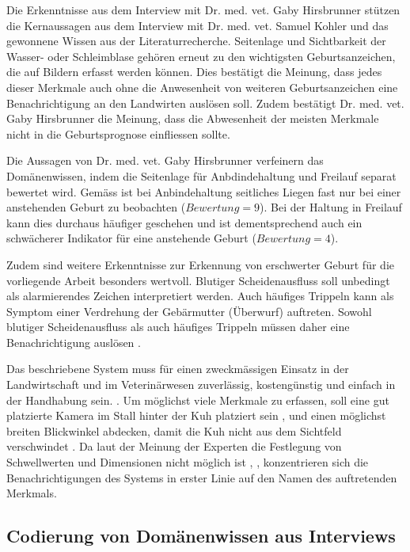 Die Erkenntnisse aus dem Interview mit Dr. med. vet. Gaby Hirsbrunner \citep{Hirsbrunner2020} stützen die Kernaussagen aus dem Interview mit Dr. med. vet. Samuel Kohler und das gewonnene Wissen aus der Literaturrecherche. Seitenlage und Sichtbarkeit der Wasser- oder Schleimblase gehören erneut zu den wichtigsten Geburtsanzeichen, die auf Bildern erfasst werden können. Dies bestätigt die Meinung, dass jedes dieser Merkmale auch ohne die Anwesenheit von weiteren Geburtsanzeichen eine Benachrichtigung an den Landwirten auslösen soll. Zudem bestätigt Dr. med. vet. Gaby Hirsbrunner	die Meinung, dass die Abwesenheit der meisten Merkmale nicht in die Geburtsprognose einfliessen sollte.  

Die Aussagen von Dr. med. vet. Gaby Hirsbrunner verfeinern das Domänenwissen, indem die Seitenlage für Anbdindehaltung und Freilauf separat bewertet wird. Gemäss \citep{Hirsbrunner2020} ist bei Anbindehaltung seitliches Liegen fast nur bei einer anstehenden Geburt zu beobachten ($Bewertung=9$). Bei der Haltung in Freilauf kann dies durchaus häufiger geschehen und ist dementsprechend auch ein schwächerer Indikator für eine anstehende Geburt ($Bewertung=4$).

Zudem sind weitere Erkenntnisse zur Erkennung von erschwerter Geburt für die vorliegende Arbeit besonders wertvoll. Blutiger Scheidenausfluss soll unbedingt als alarmierendes Zeichen interpretiert werden. Auch häufiges Trippeln kann als Symptom einer Verdrehung der Gebärmutter (Überwurf) auftreten. Sowohl blutiger Scheidenausfluss als auch häufiges Trippeln müssen daher eine Benachrichtigung auslösen \citep{Hirsbrunner2020}.

Das beschriebene System muss für einen zweckmässigen Einsatz in der Landwirtschaft und im Veterinärwesen zuverlässig, kostengünstig und einfach in der Handhabung sein. \citep{Hirsbrunner2020}. Um möglichst viele Merkmale zu erfassen, soll eine gut platzierte Kamera im Stall hinter der Kuh platziert sein \citep{Hirsbrunner2020}, \citep{Kohler2020} und einen möglichst breiten Blickwinkel abdecken, damit die Kuh nicht aus dem Sichtfeld verschwindet \cite{Muller2020}. Da laut der Meinung der Experten die Festlegung von Schwellwerten und Dimensionen nicht möglich ist \citep{Hirsbrunner2020}, \citep{Kohler2020}, konzentrieren sich die Benachrichtigungen des Systems in erster Linie auf den Namen des auftretenden Merkmals.

\subsection{Codierung von Domänenwissen aus Interviews}

